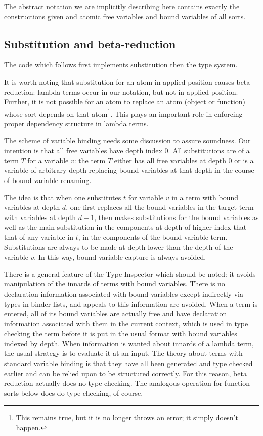 \documentclass[12pt]{article}
\begin{document}
The abstract notation we are implicitly describing here contains exactly the constructions given and atomic free variables and bound variables of all sorts.

\subsection{Substitution and beta-reduction}

The code which follows first implements substitution then the type system.

It is worth noting that substitution for an atom in applied position causes beta reduction:  lambda terms occur in our notation, but not in applied position.  Further, it is not possible
for an atom to replace an atom (object or function) whose sort depends on that atom\footnote{This remains true, but it is no longer throws an error;  it simply doesn't happen.}.  This plays an important role in enforcing proper dependency structure in lambda terms.

The scheme of variable binding needs some discussion to assure soundness.  Our intention is that
all free variables have depth index 0.  All substitutions are of a term $T$ for a variable $v$:
the term $T$ either has all free variables at depth 0 or is a variable of arbitrary depth replacing bound variables at that depth in the course of bound variable renaming.

The idea is that when one substitutes $t$ for variable $v$ in a term with bound variables at depth $d$, one first replaces all the bound variables in the target term
with variables at depth $d+1$, then makes substitutions for the bound variables as well as the main substitution in the components at depth of higher index that that
of any variable in $t$, in the components of the bound variable term.  Substitutions are always to be made at depth lower than the depth of the variable $v$.  In this way,
bound variable capture is always avoided.

There is a general feature of the Type Inspector which should be noted:  it avoids manipulation of the innards of terms with bound variables.  There is no declaration information
associated with bound variables except indirectly via types in binder lists, and appeals to this information are avoided.  When a term is entered, all of its bound variables
are actually free and have declaration information associated with them in the current context, which is used in type checking the term before it is put in the usual
format with bound variables indexed by depth.  When information is wanted about innards of a lambda term, the usual strategy is to evaluate it at an input.  The theory about
terms with standard variable binding is that they have all been generated and type checked earlier and can be relied upon to be structured correctly.  For this reason,
beta reduction actually does no type checking.  The analogous operation for function sorts below does do type checking, of course.
\end{document}
